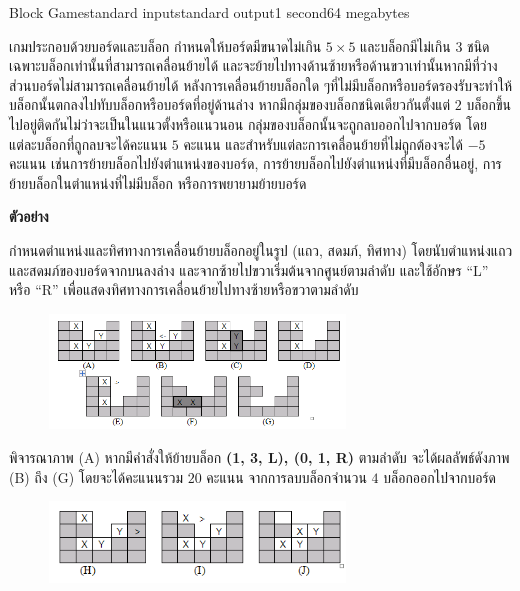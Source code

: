 \documentclass[11pt,a4paper]{article}
\begin{document}
\begin{problem}{Block Game}{standard input}{standard output}{1 second}{64 megabytes}

เกมประกอบด้วยบอร์ดและบล็อก กำหนดให้บอร์ดมีขนาดไม่เกิน $5 \times 5$ และบล็อกมีไม่เกิน $3$ ชนิด เฉพาะบล็อกเท่านั้นที่สามารถเคลื่อนย้ายได้ และจะย้ายไปทางด้านซ้ายหรือด้านขวาเท่านั้นหากมีที่ว่าง ส่วนบอร์ดไม่สามารถเคลื่อนย้ายได้ หลังการเคลื่อนย้ายบล็อกใด ๆที่ไม่มีบล็อกหรือบอร์ดรองรับจะทำให้บล็อกนั้นตกลงไปทับบล็อกหรือบอร์ดที่อยู่ด้านล่าง หากมีกลุ่มของบล็อกชนิดเดียวกันตั้งแต่ $2$ บล็อกขึ้นไปอยู่ติดกันไม่ว่าจะเป็นในแนวตั้งหรือแนวนอน กลุ่มของบล็อกนั้นจะถูกลบออกไปจากบอร์ด โดยแต่ละบล็อกที่ถูกลบจะได้คะแนน $5$ คะแนน และสำหรับแต่ละการเคลื่อนย้ายที่ไม่ถูกต้องจะได้ $-5$ คะแนน เช่นการย้ายบล็อกไปยังตำแหน่งของบอร์ด, การย้ายบล็อกไปยังตำแหน่งที่มีบล็อกอื่นอยู่, การย้ายบล็อกในตำแหน่งที่ไม่มีบล็อก หรือการพยายามย้ายบอร์ด

\bigskip

\textbf{ตัวอย่าง} 

กำหนดตำแหน่งและทิศทางการเคลื่อนย้ายบล็อกอยู่ในรูป (แถว, สดมภ์, ทิศทาง) โดยนับตำแหน่งแถวและสดมภ์ของบอร์ดจากบนลงล่าง และจากซ้ายไปขวาเริ่มต้นจากศูนย์ตามลำดับ และใช้อักษร “L” หรือ “R” เพื่อแสดงทิศทางการเคลื่อนย้ายไปทางซ้ายหรือขวาตามลำดับ

\begin{figure}[h]
\centering
\includegraphics[width=0.7\textwidth]{../latex/img/1011/1011-1.png}
\end{figure}

พิจารณาภาพ (A) หากมีคำสั่งให้ย้ายบล็อก \textbf{(1, 3, L), (0, 1, R)} ตามลำดับ จะได้ผลลัพธ์ดังภาพ (B) ถึง (G) โดยจะได้คะแนนรวม $20$ คะแนน จากการลบบล็อกจำนวน $4$ บล็อกออกไปจากบอร์ด 

\begin{figure}[h]
\centering
\includegraphics[width=0.7\textwidth]{../latex/img/1011/1011-2.png}
\end{figure}


\end{problem}
\end{document}
